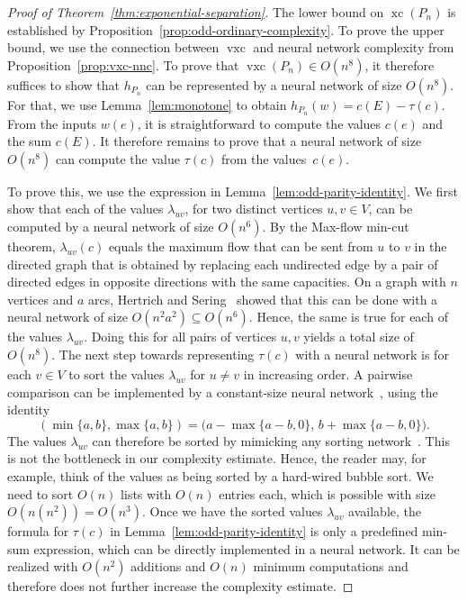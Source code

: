 \documentclass[centering,11pt,reqno]{amsart}
\theoremstyle{definition}
\DeclareMathOperator{\xc}{xc}
\DeclareMathOperator{\vxc}{vxc}
\begin{document}
\begin{proof}[Proof of Theorem~\ref{thm:exponential-separation}]
	The lower bound on $\xc(P_n)$ is established by Proposition~\ref{prop:odd-ordinary-complexity}. 
    To prove the upper bound, we use the connection between $\vxc$ and neural network complexity from Proposition~\ref{prop:vxc-nnc}. 
	To prove that $\vxc(P_n)\in O(n^8)$, it therefore suffices to show that $h_{P_n}$ can be represented by a neural network of size $O(n^8)$. For that, we use Lemma~\ref{lem:monotone} to obtain $h_{P_n}(w)=c(E)-\tau(c)$. From the inputs $w(e)$, it is straightforward to compute the values $c(e)$ and the sum $c(E)$. It therefore remains to prove that a neural network of size $O(n^8)$ can compute the value $\tau(c)$ from the values~$c(e)$.
	
	To prove this, we use the expression in Lemma~\ref{lem:odd-parity-identity}. We first show that each of the values $\lambda_{uv}$, for two distinct vertices $u,v\in V$, can be computed by a neural network of size $O(n^6)$. By the Max-flow min-cut theorem, $\lambda_{uv}(c)$ equals the maximum flow that can be sent from $u$ to $v$ in the directed graph that is obtained by replacing each undirected edge by a pair of directed edges in opposite directions with the same capacities. On a graph with $n$ vertices and $a$ arcs, Hertrich and Sering~\cite{hertrich2025relu} showed that this can be done with a neural network of size $O(n^2a^2)\subseteq O(n^6)$. Hence, the same is true for each of the values $\lambda_{uv}$. Doing this for all pairs of vertices $u,v$ yields a total size of $O(n^8)$.
	The next step towards representing $\tau(c)$ with a neural network is for each $v\in V$ to sort the values $\lambda_{uv}$ for $u\neq v$ in increasing order. A pairwise comparison can be implemented by a constant-size neural network~\cite{Arora2018}, using the identity
    \[
        (\min\{a,b\},\max\{a,b\})
        =\bigl(a-\max\{a-b,0\},\,b+\max\{a-b,0\}\bigr).
    \]
    The values $\lambda_{uv}$ can therefore be sorted by mimicking any sorting network~\cite{Batcher1968}. This is not the bottleneck in our complexity estimate. Hence, the reader may, for example, think of the values as being sorted by a hard-wired bubble sort.
    We need to sort $O(n)$ lists with $O(n)$ entries each, which is possible with size $O(n(n^2))=O(n^3)$.
	Once we have the sorted values $\lambda_{uv}$ available, the formula for $\tau(c)$ in Lemma~\ref{lem:odd-parity-identity} is only a predefined min-sum expression, which can be directly implemented in a neural network. It can be realized with $O(n^2)$ additions and $O(n)$ minimum computations and therefore does not further increase the complexity estimate.	
\end{proof}
\end{document}
